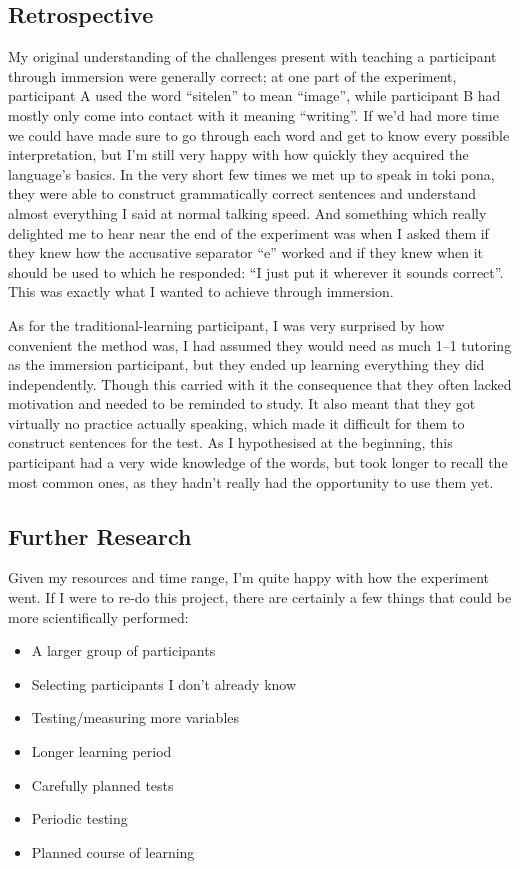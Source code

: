 \documentclass[a4paper,10pt]{article}
\begin{document}
\subsection{Retrospective}
My original understanding of the challenges present with teaching a participant through immersion were
generally correct; at one part of the experiment, participant A used the word ``sitelen'' to mean
``image'', while participant B had mostly only come into contact with it meaning ``writing''. If we'd
had more time we could have made sure to go through each word and get to know every possible
interpretation, but I'm still very happy with how quickly they acquired the language's basics.
In the very short few times we met up to speak in toki pona, they were able to construct grammatically
correct sentences and understand almost everything I said at normal talking speed. And something which
really delighted me to hear near the end of the experiment was when I asked them if they knew how the
accusative separator ``e'' worked and if they knew when it should be used to which he responded:
``I just put it wherever it sounds correct''. This was exactly what I wanted to achieve through immersion.

As for the traditional-learning participant, I was very surprised by how convenient the method was,
I had assumed they would need as much 1--1 tutoring as the immersion participant, but they ended up
learning everything they did independently. Though this carried with it the consequence that they
often lacked motivation and needed to be reminded to study. It also meant that they got virtually no
practice actually speaking, which made it difficult for them to construct sentences for the test. As I
hypothesised at the beginning, this participant had a very wide knowledge of the words, but took longer
to recall the most common ones, as they hadn't really had the opportunity to use them yet.

\subsection{Further Research}
Given my resources and time range, I'm quite happy with how the experiment went. If I were to re-do
this project, there are certainly a few things that could be more scientifically performed:

\begin{itemize}
	\item A larger group of participants
	\item Selecting participants I don't already know
	\item Testing/measuring more variables
	\item Longer learning period
	\item Carefully planned tests
	\item Periodic testing
	\item Planned course of learning
\end{itemize}
\end{document}
